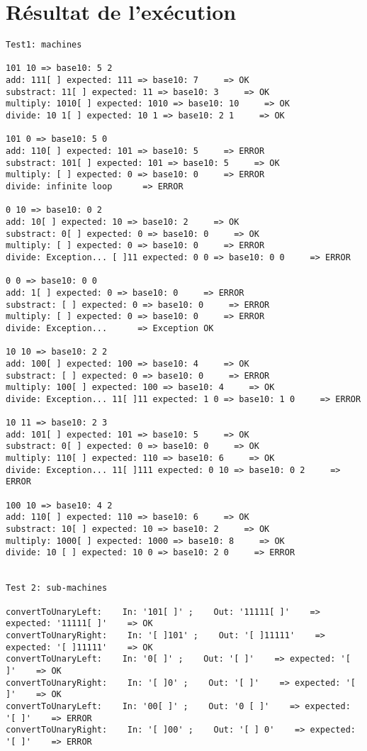 \documentclass[a4paper,11pt]{article}
\begin{document}
\section{Résultat de l'exécution}
\begin{tiny}
\begin{verbatim}
Test1: machines

101 10 => base10: 5 2
add: 111[ ] expected: 111 => base10: 7     => OK
substract: 11[ ] expected: 11 => base10: 3     => OK
multiply: 1010[ ] expected: 1010 => base10: 10     => OK
divide: 10 1[ ] expected: 10 1 => base10: 2 1     => OK

101 0 => base10: 5 0
add: 110[ ] expected: 101 => base10: 5     => ERROR
substract: 101[ ] expected: 101 => base10: 5     => OK
multiply: [ ] expected: 0 => base10: 0     => ERROR
divide: infinite loop      => ERROR

0 10 => base10: 0 2
add: 10[ ] expected: 10 => base10: 2     => OK
substract: 0[ ] expected: 0 => base10: 0     => OK
multiply: [ ] expected: 0 => base10: 0     => ERROR
divide: Exception... [ ]11 expected: 0 0 => base10: 0 0     => ERROR

0 0 => base10: 0 0
add: 1[ ] expected: 0 => base10: 0     => ERROR
substract: [ ] expected: 0 => base10: 0     => ERROR
multiply: [ ] expected: 0 => base10: 0     => ERROR
divide: Exception...      => Exception OK

10 10 => base10: 2 2
add: 100[ ] expected: 100 => base10: 4     => OK
substract: [ ] expected: 0 => base10: 0     => ERROR
multiply: 100[ ] expected: 100 => base10: 4     => OK
divide: Exception... 11[ ]11 expected: 1 0 => base10: 1 0     => ERROR

10 11 => base10: 2 3
add: 101[ ] expected: 101 => base10: 5     => OK
substract: 0[ ] expected: 0 => base10: 0     => OK
multiply: 110[ ] expected: 110 => base10: 6     => OK
divide: Exception... 11[ ]111 expected: 0 10 => base10: 0 2     => ERROR

100 10 => base10: 4 2
add: 110[ ] expected: 110 => base10: 6     => OK
substract: 10[ ] expected: 10 => base10: 2     => OK
multiply: 1000[ ] expected: 1000 => base10: 8     => OK
divide: 10 [ ] expected: 10 0 => base10: 2 0     => ERROR


Test 2: sub-machines

convertToUnaryLeft:    In: '101[ ]' ;    Out: '11111[ ]'    => expected: '11111[ ]'    => OK
convertToUnaryRight:    In: '[ ]101' ;    Out: '[ ]11111'    => expected: '[ ]11111'    => OK
convertToUnaryLeft:    In: '0[ ]' ;    Out: '[ ]'    => expected: '[ ]'    => OK
convertToUnaryRight:    In: '[ ]0' ;    Out: '[ ]'    => expected: '[ ]'    => OK
convertToUnaryLeft:    In: '00[ ]' ;    Out: '0 [ ]'    => expected: '[ ]'    => ERROR
convertToUnaryRight:    In: '[ ]00' ;    Out: '[ ] 0'    => expected: '[ ]'    => ERROR


\end{verbatim}
\end{tiny}
\end{document}
